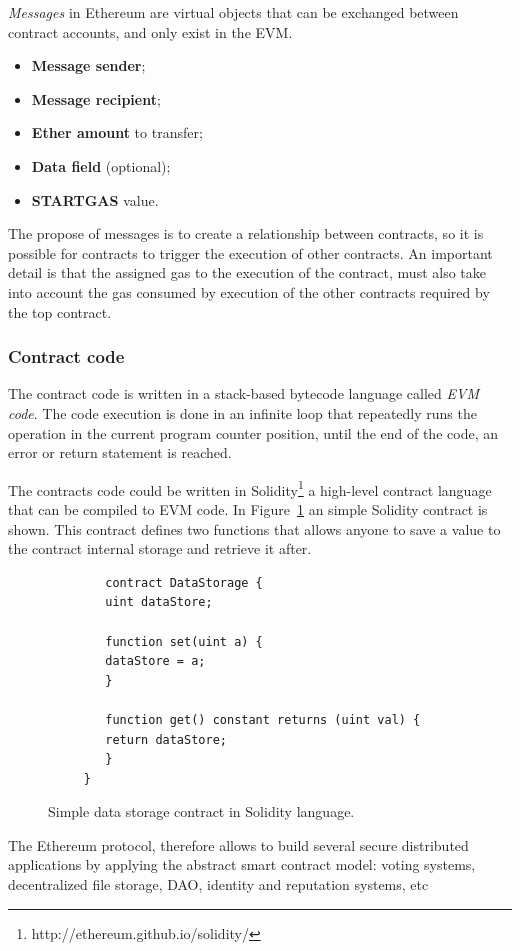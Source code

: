 \textit{Messages} in Ethereum are virtual objects that can be exchanged between contract accounts, and only exist in the \ac{EVM}.

\begin{itemize}
	\item \textbf{Message sender};
	\item \textbf{Message recipient};
	\item \textbf{Ether amount} to transfer;
	\item \textbf{Data field} (optional);
	\item \textbf{STARTGAS} value.
\end{itemize}

The propose of messages is to create a relationship between contracts, so it is possible for contracts to trigger the execution of other contracts.
An important detail is that the assigned gas to the execution of the contract,
must also take into account the gas consumed by execution of the other contracts required by the top contract.

\subsubsection{Contract code} The contract code is written in a stack-based bytecode language called \textit{\ac{EVM} code}.
The code execution is done in an infinite loop that repeatedly runs the operation in the current program counter position, until the end of the code, an error or return statement is reached.

The contracts code could be written in Solidity\footnote{http://ethereum.github.io/solidity/} a high-level contract language that can be compiled to \ac{EVM} code.
In Figure~\ref{fig:solidity-example} an simple Solidity contract is shown.
This contract defines two functions that allows anyone to save a value to the contract internal storage and retrieve it after.

\begin{figure}
	\begin{verbatim}
		contract DataStorage {
    	uint dataStore;

    	function set(uint a) {
        dataStore = a;
    	}

    	function get() constant returns (uint val) {
        return dataStore;
    	}
	 }
	\end{verbatim}
    \caption{Simple data storage contract in Solidity language.}
    \label{fig:solidity-example}
\end{figure}

The Ethereum protocol, therefore allows to build several secure distributed applications by applying the abstract smart contract model: voting systems, decentralized file storage, \ac{DAO}, identity and reputation systems, etc

